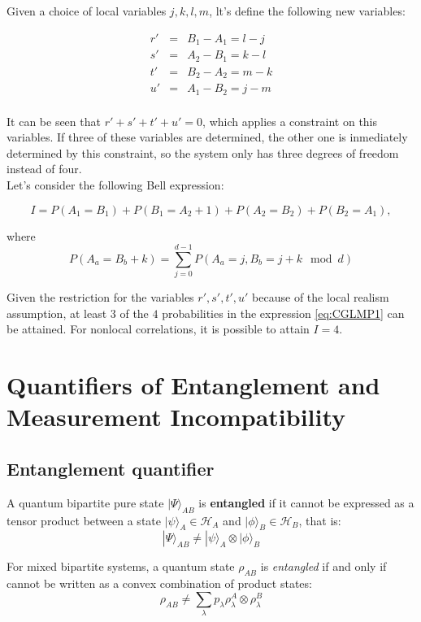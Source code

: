 \documentclass[12pt, letterpaper]{article}
\begin{document}
Given a choice of local variables $j,k,l,m$, lt's define the following new variables:

\begin{eqnarray*}
    r' &=& B_1 - A_1 = l - j \\
    s' &=& A_2 - B_1 = k - l \\
    t' &=& B_2 - A_2 = m - k \\
    u' &=& A_1 - B_2 = j - m \\
\end{eqnarray*}

It can be seen that $r'+s'+t'+u'=0$, which applies a constraint on this variables. If three of these variables are determined, the other one is inmediately determined by this constraint, so the system only has three degrees of freedom instead of four.\\

Let's consider the following Bell expression:

\begin{equation}
    I = P(A_1 = B_1) + P(B_1 = A_2 + 1) + P(A_2 = B_2) + P(B_2 = A_1),
    \label{eq:CGLMP1}
\end{equation}

where
\[
P(A_a = B_b + k) = \sum_{j=0}^{d-1} P(A_a = j, B_b = j + k \mod d)
\]

Given the restriction for the variables $r', s', t', u'$ because of the local realism assumption, at least $3$ of the $4$ probabilities in the expression \ref{eq:CGLMP1} can be attained. For nonlocal correlations, it is possible to attain $I = 4$.

\newpage
\section{Quantifiers of Entanglement and Measurement Incompatibility}

\subsection{Entanglement quantifier}

A quantum bipartite pure state $|\Psi\rangle_{AB}$ is \textbf{entangled} if it cannot be expressed as a tensor product between a state $|\psi\rangle_A \in \mathcal{H}_A$ and $|\phi\rangle_B \in \mathcal{H}_B$, that is:
\[
|\Psi\rangle_{AB} \neq |\psi \rangle_{A} \otimes |\phi \rangle_B
\]

For mixed bipartite systems, a quantum state $\rho_{AB}$ is \textit{entangled} if and only if cannot be written as a convex combination of product states:
\[
\rho_{AB} \neq \sum_\lambda p_\lambda \rho_\lambda^A \otimes \rho_\lambda^B
\]
\end{document}
